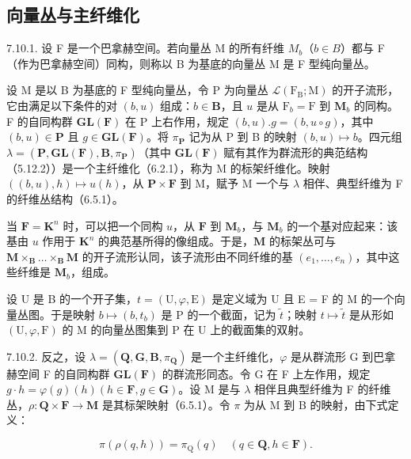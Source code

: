 \subsection{向量丛与主纤维化}

7.10.1. 设 F 是一个巴拿赫空间。若向量丛 M 的所有纤维 \(M_{b}\)（\(b \in B\)）都与 F（作为巴拿赫空间）同构，则称以 B 为基底的向量丛 M 是 F 型纯向量丛。

设 M 是以 B 为基底的 F 型纯向量丛，令 P 为向量丛 \(\mathcal{L}(\mathrm{F}_{\mathrm{B}}; \mathrm{M})\) 的开子流形，它由满足以下条件的对 \((b, u)\) 组成：\(b \in \mathbf{B}\)，且 \(u\) 是从 \(\mathrm{F}_{b} = \mathrm{F}\) 到 \(\mathbf{M}_{b}\) 的同构。F 的自同构群 \(\mathbf{GL}(\mathbf{F})\) 在 P 上右作用，规定 \((b, u). g = (b, u \circ g)\)，其中 \((b, u) \in \mathbf{P}\) 且 \(g \in \mathbf{GL}(\mathbf{F})\)。将 \(\pi_{\mathbf{P}}\) 记为从 P 到 B 的映射 \((b, u) \mapsto b\)。四元组 \(\lambda = (\mathbf{P}, \mathbf{GL}(\mathbf{F}), \mathbf{B}, \pi_{\mathbf{P}})\)（其中 \(\mathbf{GL}(\mathbf{F})\) 赋有其作为群流形的典范结构（5.12.2））是一个主纤维化（6.2.1），称为 M 的标架纤维化。映射 \(((b, u), h) \mapsto u(h)\)，从 \(\mathbf{P} \times \mathbf{F}\) 到 M，赋予 M 一个与 \(\lambda\) 相伴、典型纤维为 F 的纤维丛结构（6.5.1）。

当 \(\mathbf{F} = \mathbf{K}^n\) 时，可以把一个同构 \(u\)，从 \(\mathbf{F}\) 到 \(\mathbf{M}_b\)，与 \(\mathbf{M}_b\) 的一个基对应起来：该基由 \(u\) 作用于 \(\mathbf{K}^n\) 的典范基所得的像组成。于是，\(\mathbf{M}\) 的标架丛可与 \(\mathbf{M} \times_{\mathbf{B}} \ldots \times_{\mathbf{B}} \mathbf{M}\) 的开子流形认同，该子流形由不同纤维的基 \((e_1, \ldots, e_n)\)，其中这些纤维是 \(\mathbf{M}_b\)，组成。

设 U 是 B 的一个开子集，\(t = (\mathrm{U}, \varphi, \mathrm{E})\) 是定义域为 U 且 E = F 的 M 的一个向量丛图。于是映射 \(b \mapsto (b, t_{b})\) 是 P 的一个截面，记为 \(\tilde{t}\)；映射 \(t \mapsto \tilde{t}\) 是从形如 \((\mathrm{U}, \varphi, \mathrm{F})\) 的 M 的向量丛图集到 P 在 U 上的截面集的双射。

7.10.2. 反之，设 \(\lambda = (\mathbf{Q}, \mathbf{G}, \mathbf{B}, \pi_{\mathbf{Q}})\) 是一个主纤维化，\(\varphi\) 是从群流形 G 到巴拿赫空间 F 的自同构群 \(\mathbf{GL}(\mathbf{F})\) 的群流形同态。令 G 在 F 上左作用，规定 \(g \cdot h = \varphi(g)(h) (h \in \mathbf{F}, g \in \mathbf{G})\)。设 M 是与 \(\lambda\) 相伴且典型纤维为 F 的纤维丛，\(\rho: \mathbf{Q} \times \mathbf{F} \to \mathbf{M}\) 是其标架映射（6.5.1）。令 \(\pi\) 为从 M 到 B 的映射，由下式定义：

\[
\pi (\rho (q, h)) = \pi_ {\mathrm{Q}} (q) \quad (q \in \mathbf{Q}, h \in \mathbf{F}).
\]


